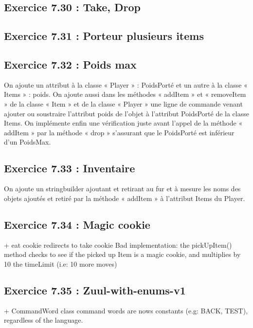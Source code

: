 \documentclass[twoside,french]{report}
\begin{document}
\subsection*{Exercice 7.30 : Take, Drop}

\subsection*{Exercice 7.31 : Porteur plusieurs items}

\subsection*{Exercice 7.32 : Poids max}

On ajoute un attribut à la classe « Player » : PoidsPorté et un autre à la classe 
« Items » : poids. On ajoute aussi dans les méthodes « addItem » et 
«  removeItem » de la classe « Item » et de la classe « Player » une ligne de 
commande venant ajouter ou soustraire l’attribut poids de l’objet à l’attribut 
PoidsPorté de la classe Items. On implémente enfin une vérification juste avant 
l’appel de la méthode « addItem » par la méthode « drop » s’assurant que le 
PoidsPorté est inférieur d’un PoidsMax.

\subsection*{Exercice 7.33 : Inventaire}

On ajoute un stringbuilder ajoutant et retirant au fur et à mesure les noms des 
objets ajoutés et retiré par la méthode « addItem » à l’attribut Items du Player.

\subsection*{Exercice 7.34 : Magic cookie}
+ eat cookie redirects to take cookie
Bad implementation: the pickUpItem() method checks to see if the picked up Item is a magic cookie, and multiplies by 10 the timeLimit (i.e: 10 more moves)

\subsection*{Exercice 7.35 : Zuul-with-enums-v1}

+ CommandWord class
command words are nows constants (e.g: BACK, TEST), regardless of the language.
\end{document}
